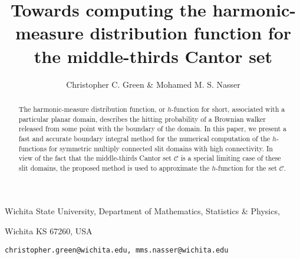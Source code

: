 \documentclass[11pt]{article}
\begin{document}
\title{Towards computing the harmonic-measure distribution function for the middle-thirds Cantor set}

\author{Christopher C. Green \& Mohamed M. S. Nasser}

\date{}
\maketitle

\vskip-0.8cm %
\centerline{Wichita State University, Department of Mathematics, Statistics \& Physics,} %
\centerline{Wichita KS 67260, USA}%
\centerline{\tt christopher.green@wichita.edu, mms.nasser@wichita.edu}
%

\begin{abstract}
The harmonic-measure distribution function, or $h$-function for short, associated with a particular planar domain, describes the hitting probability of a Brownian walker released from some point with the boundary of the domain. 
In this paper, we present a fast and accurate boundary integral method for the numerical computation of the $h$-functions for symmetric multiply connected slit domains with high connectivity.
In view of the fact that the middle-thirds Cantor set $\mathcal{C}$ is a special limiting case of these slit domains, the proposed method is used to approximate the $h$-function for the set $\mathcal{C}$. 
\end{abstract}


\begin{center}
	\begin{quotation}
		{%
		}%
	\end{quotation}
\end{center}

\begin{center}
	\begin{quotation}
		{%
		}%
	\end{quotation}
\end{center}












\end{document}
